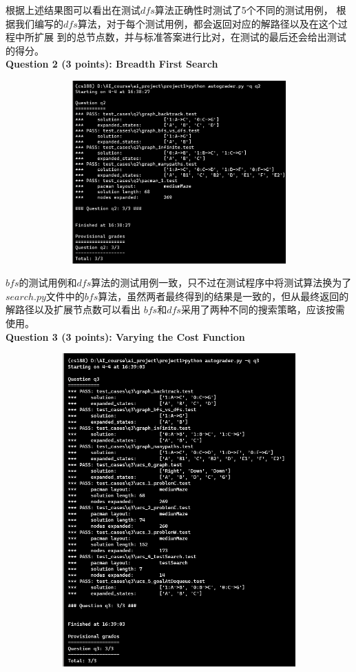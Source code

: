 \documentclass[a4paper,12pt,UTF8]{article}
\begin{document}
\begin{flushleft}
{    \normalsize{
        \hspace{1cm}根据上述结果图可以看出在测试$dfs$算法正确性时测试了5个不同的测试用例，
        根据我们编写的$dfs$算法，对于每个测试用例，都会返回对应的解路径以及在这个过程中所扩展
        到的总节点数，并与标准答案进行比对，在测试的最后还会给出测试的得分。\\
    }
    \large{
        \hspace{1cm}\textbf{
            Question 2 (3 points): Breadth First Search\\
        }
    }
    \begin{figure}[h]
        \centering
        \includegraphics[width=12cm,height=7cm]{2.png}
    \end{figure}
    \normalsize{
        \hspace{1cm}$bfs$的测试用例和$dfs$算法的测试用例一致，只不过在测试程序中将测试算法换为了
        $search.py$文件中的$bfs$算法，虽然两者最终得到的结果是一致的，但从最终返回的解路径以及扩展节点数可以看出
        $bfs$和$dfs$采用了两种不同的搜索策略，应该按需使用。\\
    }
    \large{
        \hspace{1cm}\textbf{
            Question 3 (3 points): Varying the Cost Function\\
        }
    }
    \begin{figure}[h]
        \centering
        \includegraphics[width=12cm,height=12cm]{3.png}

\end{figure}}
\end{flushleft}
\end{document}
